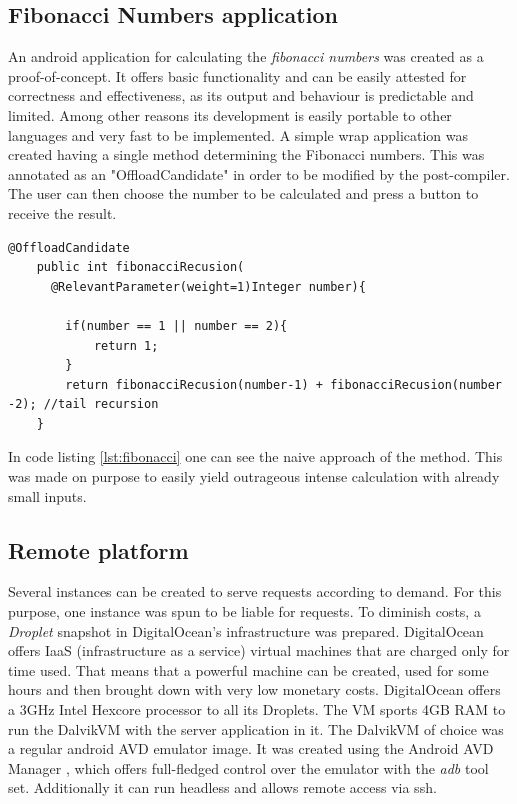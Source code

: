 \documentclass[10pt, conference, letterpaper]{IEEEtran}
\begin{document}
  \subsection{Fibonacci Numbers application}
  An android application for calculating the \textit{fibonacci numbers} was created as a proof-of-concept. It offers basic functionality and can be easily attested for correctness and effectiveness, as its output and behaviour is predictable and limited. Among other reasons its development is easily portable to other languages and very fast to be implemented. A simple wrap application was created having a single method determining the Fibonacci numbers. This was annotated as an "OffloadCandidate" in order to be modified by the post-compiler. The user can then choose the number to be calculated and press a button to receive the result.

  \begin{lstlisting}[caption=Fibonacci Numbers calculation, label=lst:fibonacci]
	@OffloadCandidate
	public int fibonacciRecusion(
      @RelevantParameter(weight=1)Integer number){

        if(number == 1 || number == 2){
            return 1;
        } 
        return fibonacciRecusion(number-1) + fibonacciRecusion(number -2); //tail recursion
    }
  \end{lstlisting}

  In code listing \ref{lst:fibonacci} one can see the naive approach of the method. This was made on purpose to easily yield outrageous intense calculation with already small inputs.

  \subsection{Remote platform}
  Several instances can be created to serve requests according to demand. For this purpose, one instance was spun to be liable for requests. To diminish costs, a \textit{Droplet} snapshot in DigitalOcean's infrastructure \cite{digitalocean} was prepared. DigitalOcean offers IaaS (infrastructure as a service) virtual machines that are charged only for time used. That means that a powerful machine can be created, used for some hours and then brought down with very low monetary costs. DigitalOcean offers a 3GHz Intel Hexcore processor to all its Droplets. The VM sports 4GB RAM to run the DalvikVM with the server application in it. The DalvikVM of choice was a regular android AVD emulator image. It was created using the Android AVD Manager \cite{androidavd}, which offers full-fledged control over the emulator with the \textit{adb} tool set. Additionally it can run headless and allows remote access via ssh.
\end{document}
